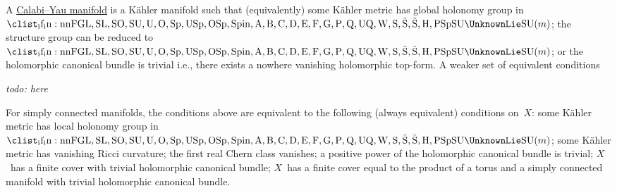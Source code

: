 \documentclass[10pt,letterpaper]{article}
\makeatletter
\newcommand{\ie}{i.e.\@}
\newcommand{\I}{\mathrm{i}}
\newcommand{\todo}[1]{\emph{todo: #1}}
\newcommand{\Lie}[1]{
  \mathrm {
    \clist_if_in:nnF
      { GL , SL , SO , SU , U , O , Sp , USp , OSp , Spin , A , B , C , D , E , F , G , P , Q , UQ , W , S , \tilde S , \tilde{S} , H , PSp }
      {#1} { \UnknownLie }
    #1
  }
}
\makeatother
\begin{document}

A \href{http://en.wikipedia.org/wiki/Calabi-Yau_manifold}{Calabi--Yau
  manifold} is a K\"ahler manifold such that (equivalently) some
K\"ahler metric has global holonomy group in $\Lie{SU}(m)$; the
structure group can be reduced to $\Lie{SU}(m)$; or the holomorphic
canonical bundle is trivial \ie, there exists a nowhere vanishing
holomorphic top-form.  A weaker set of equivalent conditions

\todo{here}

For simply connected manifolds, the conditions above are equivalent to
the following (always equivalent) conditions on~$X$: some K\"ahler
metric has local holonomy group in $\Lie{SU}(m)$; some K\"ahler metric
has vanishing Ricci curvature; the first real Chern class vanishes; a
positive power of the holomorphic canonical bundle is trivial; $X$~has a
finite cover with trivial holomorphic canonical bundle; $X$~has a finite
cover equal to the product of a torus and a simply connected manifold
with trivial holomorphic canonical bundle.









\end{document}
